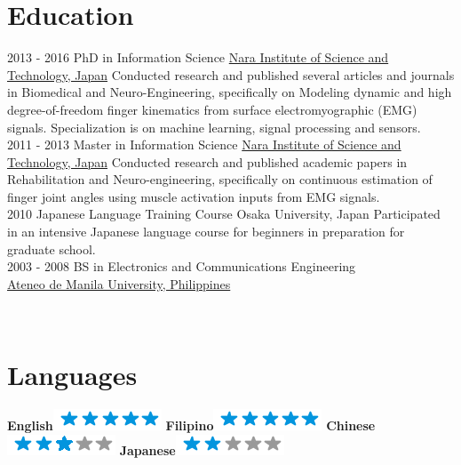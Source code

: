 \documentclass[]{friggeri-cv}
\begin{document}
\section{Education}
\begin{entrylist}
\entry
    {2013 - 2016}      
    {PhD in Information Science}
    {\href{{http://www.naist.jp/en/}}{{Nara Institute of Science and Technology, Japan}}}
    {Conducted research and published several articles and journals in Biomedical and Neuro-Engineering, specifically on Modeling dynamic and high degree-of-freedom finger kinematics from surface electromyographic (EMG) signals. Specialization is on machine learning, signal processing and sensors.
    \\}
\entry
    {2011 - 2013}      
    {Master in Information Science}
    {\href{{https://sites.google.com/view/milab/home}}{{Nara Institute of Science and Technology, Japan}}}
    {Conducted research and published academic papers in Rehabilitation and Neuro-engineering, specifically on continuous estimation of finger joint angles using muscle activation inputs from EMG signals.
    \\}
\entry
    {2010}
    {Japanese Language Training  Course}
    {Osaka University, Japan}
    {Participated in an intensive Japanese language course for beginners in preparation for graduate school.
    \\}
\entry
    {2003 - 2008}
    {BS in Electronics and Communications Engineering\\}
    {\href{{https://www.ateneo.edu/ls/sose}}{{Ateneo de Manila University, Philippines}}}
    {}
    {}
\end{entrylist}


\newpage

\begin{aside}
  ~
  \vspace{10mm}
  \section{Languages}
    \textbf{English}\includegraphics[scale=0.40]{img/5stars.png}
    \textbf{Filipino}\includegraphics[scale=0.40]{img/5stars.png}
    \textbf{Chinese}\includegraphics[scale=0.40]{img/3stars.png}
    \textbf{Japanese}\includegraphics[scale=0.40]{img/2stars.png}
    ~
\end{aside}
\end{document}
